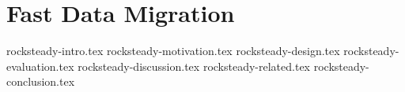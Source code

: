 \chapter{Fast Data Migration}

 {rocksteady-intro.tex}
 {rocksteady-motivation.tex}
 {rocksteady-design.tex}
 {rocksteady-evaluation.tex}
 {rocksteady-discussion.tex}
 {rocksteady-related.tex}
 {rocksteady-conclusion.tex}
